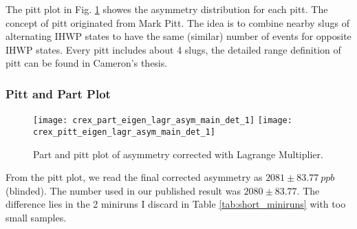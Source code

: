 The pitt plot in Fig. \ref{fig:crex_part_pitt} showes the asymmetry distribution
for each pitt. The concept of pitt originated from Mark Pitt. The idea is to combine
nearby slugs of alternating IHWP states to have the same (similar) number of events for 
opposite IHWP states. Every pitt includes about 4 slugs, the detailed range definition
of pitt can be found in Cameron's thesis.

\subsubsection{Pitt and Part Plot}
\begin{figure}
    \centering
    \texttt{[image: crex\_part\_eigen\_lagr\_asym\_main\_det\_1]}
    \texttt{[image: crex\_pitt\_eigen\_lagr\_asym\_main\_det\_1]}
    \caption{Part and pitt plot of asymmetry corrected with Lagrange Multiplier.}
    \label{fig:crex_part_pitt}
\end{figure}

From the pitt plot, we read the final corrected asymmetry as $2081 \pm 83.77\ ppb$ (blinded).
The number used in our published result was $2080 \pm 83.77$. The difference 
lies in the 2 miniruns I discard in Table \ref{tab:short_miniruns} with too small
samples.
